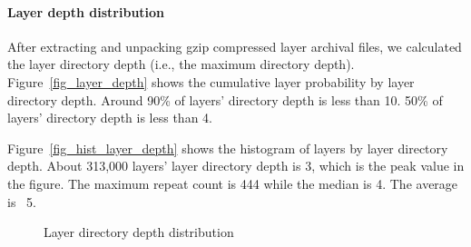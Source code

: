 
\paragraph{Layer depth distribution}

After extracting and unpacking gzip compressed layer archival files, we
calculated the layer directory depth (i.e., the maximum directory depth).
%
Figure~\ref{fig_layer_depth} shows the cumulative layer probability by layer
directory depth.
%
Around 90\% of layers' directory depth is less than 10. 50\% of layers'
directory depth is less than 4. 

Figure~\ref{fig_hist_layer_depth} shows the histogram of layers by layer
directory depth.
%
About 313,000 layers' layer directory depth is 3, which is the peak value in
the figure.
%
The maximum repeat count is 444 while the median is 4. The average is ~5.

\begin{figure}[!t]
	\centering
	\caption{Layer directory depth distribution}
	\label{fig-layer-dir}
\end{figure}
